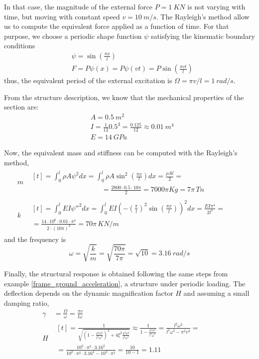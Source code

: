 \begin{Answer}[ref={moving_load}]
In that case, the magnitude of the external force $P=\SI{1}{KN}$ is not varying with time, but moving with constant speed $v=\SI{10}{m/s}$. The Rayleigh's method allow us to compute the equivalent force applied as a function of time. For that purpose, we choose a periodic shape function $\psi$ satisfying the kinematic boundary conditions
\begin{align*}
&\psi = \sin\left(\frac{\pi x}{l}\right) \\
&F = P\psi(x) = P\psi(vt) = P\sin\left(\frac{\pi vt}{l}\right)
\end{align*}
thus, the equivalent period of the external excitation is $\Omega = \pi v/l = \SI{1}{rad/s}$.

From the structure description, we know that the mechanical properties of the section are:
\begin{align*}
&A = \SI{0.5}{m^2} \\
&I = \frac{1}{12}0.5^3 = \frac{0.125}{12} \approx \SI{0.01}{m^4}\\
&E = \SI{14}{GPa}
\end{align*}

Now, the equivalent mass and stiffness can be computed with the Rayleigh's method,
\begin{align*}
m& \begin{multlined}[t]= \int_0^l \rho A\psi^2dx = \int_0^l \rho A\sin^2\left(\frac{\pi x}{l}\right)dx = \frac{\rho Al}{2} = \\
\phantom{\hspace{10em}}= \frac{2800 \cdot 0.5 \cdot 10\pi}{2} = 7000\pi Kg = 7\pi \,\si{Tn}\end{multlined} \\
k& \begin{multlined}[t]= \int_0^l EI\psi''^2dx = \int_0^l EI\left(-\left(\frac{\pi}{l}\right)^2\sin\left(\frac{\pi x}{l}\right)\right)^2dx = \frac{EI\pi^4}{2l^3} = \qquad \\
= \frac{14\cdot 10^6 \cdot 0.01 \cdot \pi^4}{2 \cdot (10\pi)^3} =
70\pi \,\si{KN/m} \end{multlined}
\end{align*}
and the frequency is
$$
\omega = \sqrt{\frac{k}{m}} = \sqrt{\frac{70\pi}{7\pi}} = \sqrt{10} = \SI{3.16}{rad/s}
$$

Finally, the structural response is obtained following the same steps from example \ref{frame_ground_acceleration}, a structure under periodic loading. The deflection depends on the dynamic magnification factor $H$ and assuming a small damping ratio,
\begin{align*}
\gamma& = \frac{\Omega}{\omega} = \frac{\pi v}{l\omega} \\
H& \begin{multlined}[t]= \frac{1}{\sqrt{\left(1-\frac{\pi^2v^2}{l^2\omega^2}\right)^2 + 4\xi^2\frac{\pi^2v^2}{l^2\omega^2}}} \approx \frac{1}{1-\frac{\pi^2v^2}{l^2\omega^2}} = \frac{l^2\omega^2}{l^2\omega^2-\pi^2v^2} = \qquad \\
= \frac{10^2\cdot\pi^2\cdot 3.16^2}{10^2\cdot\pi^2\cdot 3.16^2 - 10^2\cdot\pi^2}
= \frac{10}{10-1} = 1.11 \end{multlined}
\end{align*}


\end{Answer}
